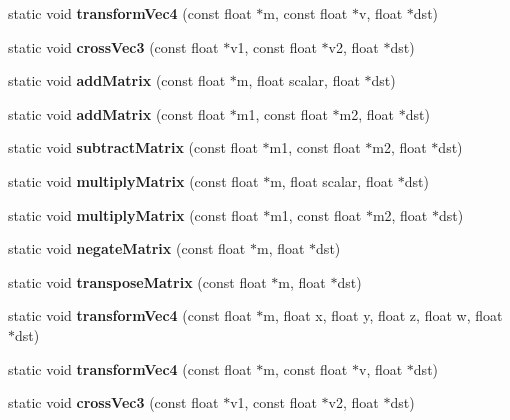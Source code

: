 \begin{DoxyCompactItemize}
\item 
\mbox{\label{classMathUtilC_a7cb0eef0172a1750f7d3c651686050af}} 
static void {\bfseries transform\+Vec4} (const float $\ast$m, const float $\ast$v, float $\ast$dst)
\item 
\mbox{\label{classMathUtilC_acbe3ff2a5e6a027b61aa8fa94d51e1cd}} 
static void {\bfseries cross\+Vec3} (const float $\ast$v1, const float $\ast$v2, float $\ast$dst)
\item 
\mbox{\label{classMathUtilC_a53c74837fa345329b26872235cd0673f}} 
static void {\bfseries add\+Matrix} (const float $\ast$m, float scalar, float $\ast$dst)
\item 
\mbox{\label{classMathUtilC_ad714338ac59dcab45db3651c44d3cb33}} 
static void {\bfseries add\+Matrix} (const float $\ast$m1, const float $\ast$m2, float $\ast$dst)
\item 
\mbox{\label{classMathUtilC_a4f547eabb74b8ac07583b068f2b80254}} 
static void {\bfseries subtract\+Matrix} (const float $\ast$m1, const float $\ast$m2, float $\ast$dst)
\item 
\mbox{\label{classMathUtilC_a31ac8d47c4dc59e6cafc12d1ef38cdec}} 
static void {\bfseries multiply\+Matrix} (const float $\ast$m, float scalar, float $\ast$dst)
\item 
\mbox{\label{classMathUtilC_a8a46061e8c359c8b30bcc1ad011b524e}} 
static void {\bfseries multiply\+Matrix} (const float $\ast$m1, const float $\ast$m2, float $\ast$dst)
\item 
\mbox{\label{classMathUtilC_a6300d07731e1c83fbce853fd67296b88}} 
static void {\bfseries negate\+Matrix} (const float $\ast$m, float $\ast$dst)
\item 
\mbox{\label{classMathUtilC_a2d878e8d5e93fe34941abc28aeef214d}} 
static void {\bfseries transpose\+Matrix} (const float $\ast$m, float $\ast$dst)
\item 
\mbox{\label{classMathUtilC_a7957daa879db4180736bf69893ad929b}} 
static void {\bfseries transform\+Vec4} (const float $\ast$m, float x, float y, float z, float w, float $\ast$dst)
\item 
\mbox{\label{classMathUtilC_a4a88ec7676f61e3d37a44e558681d965}} 
static void {\bfseries transform\+Vec4} (const float $\ast$m, const float $\ast$v, float $\ast$dst)
\item 
\mbox{\label{classMathUtilC_ab21efce903795059c6bf925f875c2df2}} 
static void {\bfseries cross\+Vec3} (const float $\ast$v1, const float $\ast$v2, float $\ast$dst)
\end{DoxyCompactItemize}



